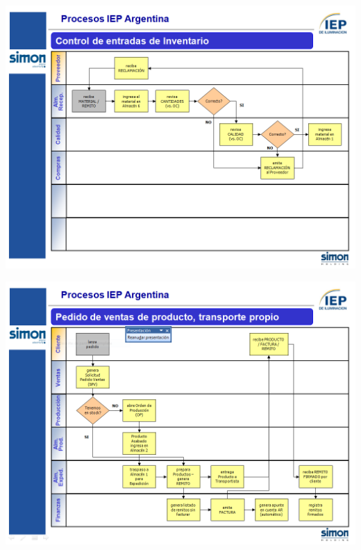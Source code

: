 \begin{center}
 \includegraphics[angle=90,scale=0.80,keepaspectratio=true]{./Images/Procesos-Circuitos-Originales-IEP/Circuito-Compras2-IEP.png}
\end{center}

\begin{center}
 \includegraphics[angle=90,scale=0.80,keepaspectratio=true]{./Images/Procesos-Circuitos-Originales-IEP/Circuito-Ventas-IEP.png}
\end{center}

